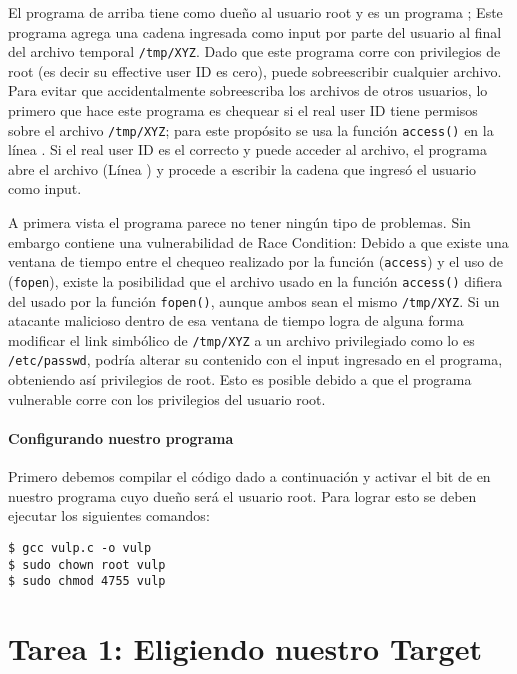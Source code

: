 El programa de arriba tiene como dueño al usuario root y es un programa \setuid; Este programa agrega una cadena ingresada como input por parte del usuario al final del archivo temporal {\tt /tmp/XYZ}. Dado que este programa corre con privilegios de root (es decir su effective user ID es cero), puede sobreescribir cualquier archivo. Para evitar que  accidentalmente sobreescriba los archivos de otros usuarios, lo primero que hace este programa es chequear si el real user ID tiene permisos sobre el archivo {\tt /tmp/XYZ}; para este propósito se usa la función {\tt access()} en la línea . Si el real user ID es el correcto y puede acceder al archivo, el programa abre el archivo (Línea ) y procede a escribir la cadena que ingresó el usuario como input.

A primera vista el programa parece no tener ningún tipo de problemas. Sin embargo contiene una vulnerabilidad de Race Condition: Debido a que existe una ventana de tiempo entre el chequeo realizado por la función ({\tt access}) y el uso de ({\tt fopen}), existe la posibilidad que el archivo usado en la función {\tt access()} difiera del usado por la función {\tt fopen()}, aunque ambos sean el mismo {\tt /tmp/XYZ}. Si un atacante malicioso dentro de esa ventana de tiempo logra de alguna forma modificar el link simbólico de {\tt /tmp/XYZ} a un archivo privilegiado como lo es \texttt{/etc/passwd}, podría alterar su contenido con el input ingresado en el programa, obteniendo así privilegios de root. Esto es posible debido a que el programa vulnerable corre con los privilegios del usuario root.


\paragraph{Configurando nuestro programa \setuid}
Primero debemos compilar el código dado a continuación y activar el bit de \setuid en nuestro programa cuyo dueño será el usuario root.
Para lograr esto se deben ejecutar los siguientes comandos:

\begin{lstlisting}
$ gcc vulp.c -o vulp
$ sudo chown root vulp
$ sudo chmod 4755 vulp
\end{lstlisting}



\section{Tarea 1: Eligiendo nuestro Target}

